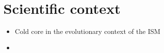 \section{Scientific context} 
\begin{itemize}
\item{Cold core in the evolutionary context of the ISM}
\item{}
\end{itemize}
  
  
  